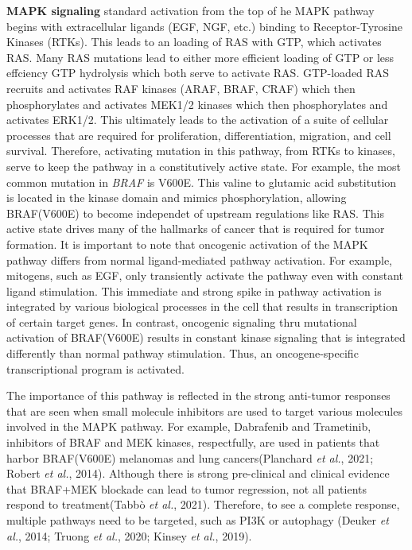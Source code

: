 \textbf{MAPK signaling} standard activation from the top of he MAPK pathway begins with extracellular ligands (EGF, NGF, etc.) binding to Receptor-Tyrosine Kinases (RTKs). This leads to an loading of RAS with GTP, which activates RAS. Many RAS mutations lead to either more efficient loading of GTP or less effciency GTP hydrolysis which both serve to activate RAS. GTP-loaded RAS recruits and activates RAF kinases (ARAF, BRAF, CRAF) which then phosphorylates and activates MEK1/2 kinases which then phosphorylates and activates ERK1/2. This ultimately leads to the activation of a suite of cellular processes that are required for proliferation, differentiation, migration, and cell survival. Therefore, activating mutation in this pathway, from RTKs to kinases, serve to keep the pathway in a constitutively active state. For example, the most common mutation in \emph{BRAF} is V600E. This valine to glutamic acid substitution is located in the kinase domain and mimics phosphorylation, allowing BRAF(V600E) to become independet of upstream regulations like RAS. This active state drives many of the hallmarks of cancer that is required for tumor formation. It is important to note that oncogenic activation of the MAPK pathway differs from normal ligand-mediated pathway activation. For example, mitogens, such as EGF, only transiently activate the pathway even with constant ligand stimulation. This immediate and strong spike in pathway activation is integrated by various biological processes in the cell that results in transcription of certain target genes. In contrast, oncogenic signaling thru mutational activation of BRAF(V600E) results in constant kinase signaling that is integrated differently than normal pathway stimulation. Thus, an oncogene-specific transcriptional program is activated.

The importance of this pathway is reflected in the strong anti-tumor responses that are seen when small molecule inhibitors are used to target various molecules involved in the MAPK pathway. For example, Dabrafenib and Trametinib, inhibitors of BRAF and MEK kinases, respectfully, are used in patients that harbor BRAF(V600E) melanomas and lung cancers(Planchard \emph{et al.}, 2021; Robert \emph{et al.}, 2014). Although there is strong pre-clinical and clinical evidence that BRAF+MEK blockade can lead to tumor regression, not all patients respond to treatment(Tabbò \emph{et al.}, 2021). Therefore, to see a complete response, multiple pathways need to be targeted, such as PI3K or autophagy (Deuker \emph{et al.}, 2014; Truong \emph{et al.}, 2020; Kinsey \emph{et al.}, 2019).

